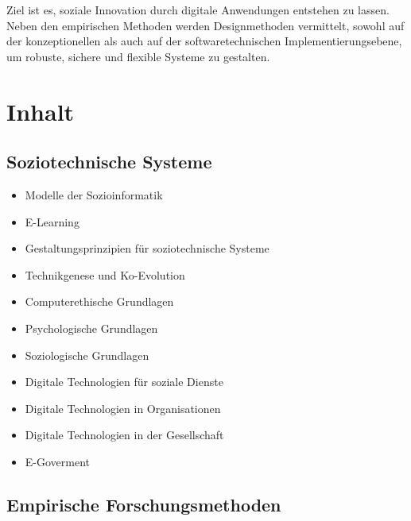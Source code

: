 Ziel ist es, soziale Innovation durch digitale Anwendungen entstehen zu
lassen. Neben den empirischen Methoden werden Designmethoden vermittelt,
sowohl auf der konzeptionellen als auch auf der softwaretechnischen
Implementierungsebene, um robuste, sichere und flexible Systeme zu
gestalten.

\section*{Inhalt\label{/mi-2017/modulbeschreibungen-bachelor/BA_Vertiefung_SocialComputing}}\label{inhaltpathlabelmi-2017modulbeschreibungen-bachelorbaux5fvertiefungux5fsocialcomputing}

\subsection*{Soziotechnische
Systeme\label{/mi-2017/modulbeschreibungen-bachelor/BA_Vertiefung_SocialComputing}}\label{soziotechnische-systemepathlabelmi-2017modulbeschreibungen-bachelorbaux5fvertiefungux5fsocialcomputing-2}

\begin{itemize}
\tightlist
\item
  Modelle der Sozioinformatik
\item
  E-Learning
\item
  Gestaltungsprinzipien für soziotechnische Systeme
\item
  Technikgenese und Ko-Evolution
\item
  Computerethische Grundlagen
\item
  Psychologische Grundlagen
\item
  Soziologische Grundlagen
\item
  Digitale Technologien für soziale Dienste
\item
  Digitale Technologien in Organisationen
\item
  Digitale Technologien in der Gesellschaft
\item
  E-Goverment
\end{itemize}

\subsection*{Empirische
Forschungsmethoden\label{/mi-2017/modulbeschreibungen-bachelor/BA_Vertiefung_SocialComputing}}\label{empirische-forschungsmethodenpathlabelmi-2017modulbeschreibungen-bachelorbaux5fvertiefungux5fsocialcomputing-2}

